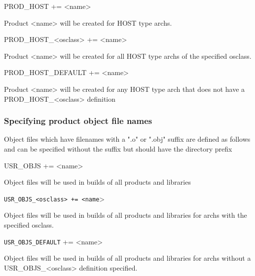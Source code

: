 \begin{description}\item {}PROD\_HOST += \textless{}name\textgreater{}

\end{description}Product \textless{}name\textgreater{} will be created for HOST type archs.

\begin{description}\item PROD\_HOST\_\textless{}osclass\textgreater{} += \textless{}name\textgreater{}

\end{description}Product \textless{}name\textgreater{} will be created for all HOST type archs of the specified osclass.

\begin{description}\item PROD\_HOST\_DEFAULT += \textless{}name\textgreater{}

\end{description}Product \textless{}name\textgreater{} will be created for any HOST type arch that does not have a PROD\_HOST\_\textless{}osclass\textgreater{} 
definition

\subsubsection{Specifying product object file names}

Object files which have filenames with a ".o" or ".obj" suffix are defined as follows and can be specified without the 
suffix but should have the directory prefix 

\begin{description}\item {}USR\_OBJS += \textless{}name\textgreater{}

\end{description}Object files will be used in builds of all products and libraries

\begin{description}\item \verb|USR_OBJS_<osclass> += <name|\textgreater{}

\end{description}Object files will be used in builds of all products and libraries for archs with the specified osclass.

\begin{description}\item \verb|USR_OBJS_DEFAULT| += \textless{}name\textgreater{}

\end{description}Object files will be used in builds of all products and libraries for archs without a USR\_OBJS\_\textless{}osclass\textgreater{} 
definition specified.

